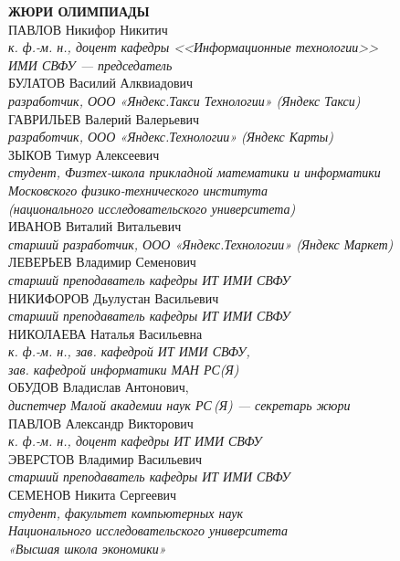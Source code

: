 \noindent
\textbf{ЖЮРИ ОЛИМПИАДЫ}
\\[2mm]
ПАВЛОВ Никифор Никитич \\
\textit{к. ф.-м. н., доцент кафедры <<Информационные технологии>>\\ ИМИ СВФУ --- председатель}
\\[2mm]
БУЛАТОВ Василий Алквиадович\\
\textit{разработчик, ООО «Яндекс.Такси Технологии» (Яндекс Такси)}
\\[2mm]
ГАВРИЛЬЕВ Валерий Валерьевич\\
\textit{разработчик, ООО «Яндекс.Технологии» (Яндекс Карты)}
\\[2mm]
ЗЫКОВ Тимур Алексеевич\\ 
\textit{студент, Физтех-школа прикладной математики и информатики \\
Московского физико-технического института \\
(национального исследовательского университета)}
\\[2mm]
ИВАНОВ Виталий Витальевич\\
\textit{старший разработчик, ООО «Яндекс.Технологии» (Яндекс Маркет) }
\\[2mm]
ЛЕВЕРЬЕВ Владимир Семенович \\
\textit{старший преподаватель кафедры ИТ ИМИ СВФУ}
\\[2mm]
НИКИФОРОВ Дьулустан Васильевич \\
\textit{старший преподаватель кафедры ИТ ИМИ СВФУ}
\\[2mm]
НИКОЛАЕВА Наталья Васильевна \\
\textit{к. ф.-м. н., зав. кафедрой ИТ ИМИ СВФУ,\\
зав. кафедрой информатики МАН РС(Я)}
\\[2mm]
ОБУДОВ Владислав Антонович, \\
\textit{диспетчер  Малой академии наук РС\,(Я) --- секретарь жюри}
\\[2mm]
ПАВЛОВ Александр Викторович \\
\textit{к. ф.-м. н., доцент кафедры ИТ ИМИ СВФУ}
\\[2mm]
ЭВЕРСТОВ Владимир Васильевич \\
\textit{старший преподаватель кафедры ИТ ИМИ СВФУ}
\\[2mm]
СЕМЕНОВ Никита Сергеевич\\
\textit{студент, факультет компьютерных наук \\
Национального исследовательского университета \\
«Высшая школа экономики»}
